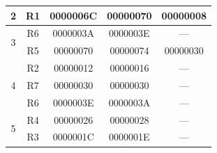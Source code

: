 \begin{table}[ht]
{\begin{tabular}{|c|c|cc|c|}
        2                           & R1                              & \multicolumn{1}{c|}{0000006C}                                                        & 00000070                                                           & 00000008                                                                                   \\ \hline
        \multirow{2}{*}{3}          & R6                              & \multicolumn{1}{c|}{0000003A}                                                        & 0000003E                                                           & ---                                                                                        \\ \cline{2-5} 
                                    & R5                              & \multicolumn{1}{c|}{00000070}                                                        & 00000074                                                           & 00000030                                                                                   \\ \hline
        \multirow{3}{*}{4}          & R2                              & \multicolumn{1}{c|}{00000012}                                                        & 00000016                                                           & ---                                                                                        \\ \cline{2-5} 
                                    & R7                              & \multicolumn{1}{c|}{00000030}                                                        & 00000030                                                           & ---                                                                                        \\ \cline{2-5} 
                                    & R6                              & \multicolumn{1}{c|}{0000003E}                                                        & 0000003A                                                           & ---                                                                                        \\ \hline
        \multirow{2}{*}{5}          & R4                              & \multicolumn{1}{c|}{00000026}                                                        & 00000028                                                           & ---                                                                                        \\ \cline{2-5} 
                                    & R3                              & \multicolumn{1}{c|}{0000001C}                                                        & 0000001E                                                           & ---                                                                                        \\ \hline
    \end{tabular}
    }
\end{table}